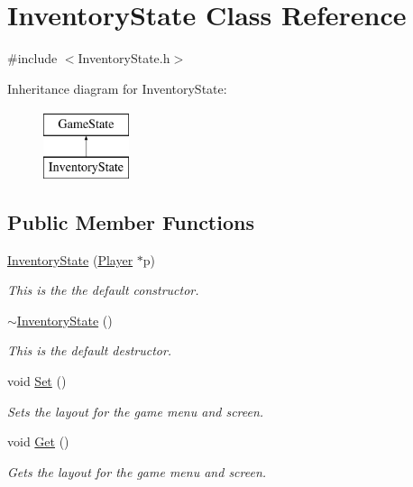 \hypertarget{classInventoryState}{\section{Inventory\-State Class Reference}
\label{classInventoryState}
}


{\ttfamily \#include $<$Inventory\-State.\-h$>$}

Inheritance diagram for Inventory\-State\-:\begin{figure}[H]
\begin{center}
\leavevmode
\includegraphics[height=2.000000cm]{classInventoryState}
\end{center}
\end{figure}
\subsection*{Public Member Functions}
\begin{DoxyCompactItemize}
\item 
\hyperlink{classInventoryState_aefaeaf24b39ac70fe81617a46f1a2411}{Inventory\-State} (\hyperlink{classPlayer}{Player} $\ast$p)
\begin{DoxyCompactList}\small\item\em This is the the default constructor. \end{DoxyCompactList}\item 
\hyperlink{classInventoryState_a50f492ed158b775a07ceb1af4a52c656}{$\sim$\-Inventory\-State} ()
\begin{DoxyCompactList}\small\item\em This is the default destructor. \end{DoxyCompactList}\item 
void \hyperlink{classInventoryState_a47936e9d5683d344e87f3da176e97e4b}{Set} ()
\begin{DoxyCompactList}\small\item\em Sets the layout for the game menu and screen. \end{DoxyCompactList}\item 
void \hyperlink{classInventoryState_a9358c4937e5bfe24017ac8985d56ed06}{Get} ()
\begin{DoxyCompactList}\small\item\em Gets the layout for the game menu and screen. \end{DoxyCompactList}\end{DoxyCompactItemize}
